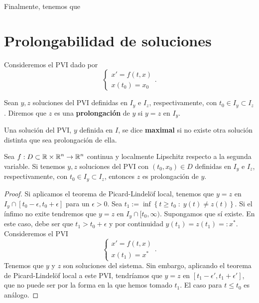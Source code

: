 Finalmente, tenemos que\chapter{Prolongabilidad de soluciones}
Consideremos el PVI dado por
\[
\begin{cases}
x' = f\left(t,x\right) \\
x\left(t_{0}\right)=x_{0}
\end{cases}
.\]

\begin{definition}
Sean $\displaystyle y,z $ soluciones del PVI definidas en $\displaystyle I_{y} $ e $\displaystyle I_{z} $, respectivamente, con $\displaystyle t_{0} \in I_{y}\subset I_{z} $. Diremos que $\displaystyle z $ es una \textbf{prolongación} de $\displaystyle y $ si $\displaystyle y = z $ en $\displaystyle I_{y} $.
\end{definition}
\begin{definition}
Una solución del PVI, $\displaystyle y $ definida en $\displaystyle I $, se dice \textbf{maximal} si no existe otra solución distinta que sea prolongación de ella.
\end{definition}
\begin{lema}
Sea $\displaystyle f : D\subset \mathbb{R} \times \mathbb{R}^{n} \to \mathbb{R}^{n} $ continua y localmente Lipschitz respecto a la segunda variable. Si tenemos $\displaystyle y,z $ soluciones del PVI con $\displaystyle \left(t_{0}, x_{0}\right)\in D $ definidas en $\displaystyle I_{y} $ e $\displaystyle I_{z} $, respectivamente, con $\displaystyle t_{0} \in I_{y} \subset I_{z} $, entonces $\displaystyle z $ es prolongación de $\displaystyle y $. 
\end{lema}
\begin{proof}
	Si aplicamos el teorema de Picard-Lindelöf local, tenemos que $\displaystyle y = z $ en $\displaystyle I_{y}\cap\left[t_{0}-\epsilon, t_{0} + \epsilon \right]  $ para un $\displaystyle \epsilon > 0 $. Sea $\displaystyle t_{1}:= \inf \left\{ t \geq t_{0} \; : \; y\left(t\right)\neq z\left(t\right)\right\}  $. Si el ínfimo no exite tendremos que $\displaystyle y = z $ en $\displaystyle I_{y} \cap [t_{0}, \infty) $. Supongamos que sí existe. 
	En este caso, debe ser que $\displaystyle t_{1} > t_{0} + \epsilon  $ y por continuidad $\displaystyle y\left(t_{1}\right)=z\left(t_{1}\right)=:x^{*} $. Consideremos el PVI
	\[
	\begin{cases}
	x' = f\left(t,x\right) \\
	x\left(t_{1}\right)=x^{*}
	\end{cases}
	.\]
	Tenemos que $\displaystyle y $ y $\displaystyle z $ son soluciones del sistema. Sin embargo, aplicando el teorema de Picard-Lindelöf local a este PVI, tendríamos que $\displaystyle y = z $ en $\displaystyle \left[t_{1}-\epsilon', t_{1} + \epsilon '\right]  $, que no puede ser por la forma en la que hemos tomado $\displaystyle t_{1} $. El caso para $\displaystyle t \leq t_{0} $ es análogo.	
\end{proof}
